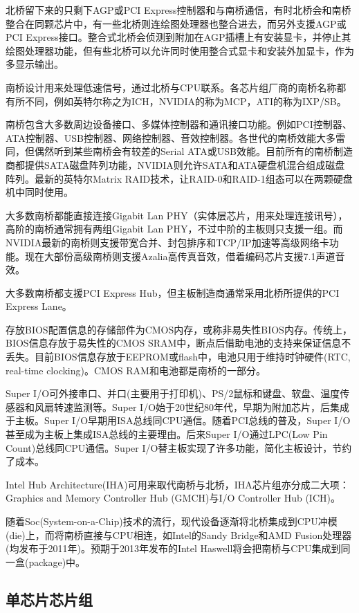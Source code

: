 北桥留下来的只剩下AGP或PCI Express控制器和与南桥通信，有时北桥会和南桥整合在同颗芯片中，有一些北桥则连绘图处理器也整合进去，而另外支援AGP或PCI Express接口。整合式北桥会侦测到附加在AGP插槽上有安装显卡，并停止其绘图处理器功能，但有些北桥可以允许同时使用整合式显卡和安装外加显卡，作为多显示输出。

南桥设计用来处理低速信号，通过北桥与CPU联系。各芯片组厂商的南桥名称都有所不同，例如英特尔称之为ICH，NVIDIA的称为MCP，ATI的称为IXP/SB。

南桥包含大多数周边设备接口、多媒体控制器和通讯接口功能。例如PCI控制器、ATA控制器、USB控制器、网络控制器、音效控制器。各世代的南桥效能大多雷同，但偶然听到某些南桥会有较差的Serial ATA或USB效能。目前所有的南桥制造商都提供SATA磁盘阵列功能，NVIDIA则允许SATA和ATA硬盘机混合组成磁盘阵列。最新的英特尔Matrix RAID技术，让RAID-0和RAID-1组态可以在两颗硬盘机中同时使用。

大多数南桥都能直接连接Gigabit Lan PHY（实体层芯片，用来处理连接讯号），高阶的南桥通常拥有两组Gigabit Lan PHY，不过中阶的主板则只支援一组。而NVIDIA最新的南桥则支援带宽合并、封包排序和TCP/IP加速等高级网络卡功能。现在大部份高级南桥则支援Azalia高传真音效，借着编码芯片支援7.1声道音效。

大多数南桥都支援PCI Express Hub，但主板制造商通常采用北桥所提供的PCI Express Lane。

存放BIOS配置信息的存储部件为CMOS内存，或称非易失性BIOS内存。传统上，BIOS信息存放于易失性的CMOS SRAM中，断点后借助电池的支持来保证信息不丢失。目前BIOS信息存放于EEPROM或flash中，电池只用于维持时钟硬件(RTC, real-time clocking)。CMOS RAM和电池都是南桥的一部分。

Super I/O可外接串口、并口(主要用于打印机)、PS/2鼠标和键盘、软盘、温度传感器和风扇转速监测等。Super I/O始于20世纪80年代，早期为附加芯片，后集成于主板。Super I/O早期用ISA总线同CPU通信。随着PCI总线的普及，Super I/O甚至成为主板上集成ISA总线的主要理由。后来Super I/O通过LPC(Low Pin Count)总线同CPU通信。Super I/O替主板实现了许多功能，简化主板设计，节约了成本。

Intel Hub Architecture(IHA)可用来取代南桥与北桥，IHA芯片组亦分成二大项：Graphics and Memory Controller Hub (GMCH)与I/O Controller Hub (ICH)。

随着Soc(System-on-a-Chip)技术的流行，现代设备逐渐将北桥集成到CPU冲模(die)上，而将南桥直接与CPU相连，如Intel的Sandy Bridge和AMD Fusion处理器(均发布于2011年)。预期于2013年发布的Intel Haswell将会把南桥与CPU集成到同一盒(package)中。

\subsection{单芯片芯片组}

